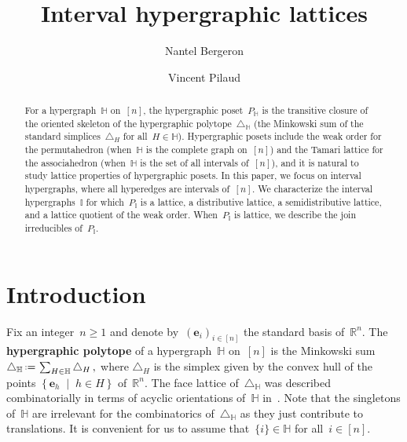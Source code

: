 \documentclass[reqno]{amsart}
\title{Interval hypergraphic lattices}
\author[N.~Bergeron]{Nantel Bergeron}
\author{Vincent Pilaud}
\theoremstyle{definition}
\newcommand{\R}{\mathbb{R}} %
\renewcommand{\b}[1]{\boldsymbol{#1}} %
\newcommand{\set}[2]{\left\{ #1 \;\middle|\; #2 \right\}} %
\newcommand{\eqdef}{\mbox{\,\raisebox{0.2ex}{\scriptsize\ensuremath{\mathrm:}}\ensuremath{=}\,}} %
\newcommand{\simplex}{\triangle} %
\newcommand{\defn}[1]{\textbf{\textsf{\color{PineGreen} #1}}} %
\newcommand{\HH}{\mathbb H}  %
\newcommand{\II}{\mathbb I} %
\begin{document}
\begin{abstract}
For a hypergraph~$\HH$ on~$[n]$, the hypergraphic poset~$P_\HH$ is the transitive closure of the oriented skeleton of the hypergraphic polytope~$\simplex_\HH$ (the Minkowski sum of the standard simplices~$\simplex_H$ for all~$H \in \HH$).
Hypergraphic posets include the weak order for the permutahedron (when~$\HH$ is the complete graph on~$[n]$) and the Tamari lattice for the associahedron (when~$\HH$ is the set of all intervals of~$[n]$), and it is natural to study lattice properties of hypergraphic posets.
In this paper, we focus on interval hypergraphs, where all hyperedges are intervals of~$[n]$.
We characterize the interval hypergraphs~$\II$ for which~$P_\II$ is a lattice, a distributive lattice, a semidistributive lattice, and a lattice quotient of the weak order.
When~$P_\II$ is lattice, we describe the join irreducibles of~$P_\II$.
\end{abstract}

\maketitle

\tableofcontents


\section{Introduction}
\label{sec:introduction}

Fix an integer~$n \ge 1$ and denote by~$(\b{e}_i)_{i \in [n]}$ the standard basis of~$\R^n$.
The \defn{hypergraphic polytope} of a hypergraph~$\HH$ on~$[n]$ is the Minkowski sum
\(
\simplex_\HH \eqdef \sum_{H\in \HH} \simplex_H\,,
\)
where $\simplex_H$ is the simplex given by the convex hull of the points $\set{\b{e}_h}{h \in H}$ of~$\R^n$.
The face lattice of~$\simplex_\HH$ was described combinatorially in terms of acyclic orientations of~$\HH$ in~\cite{BenedettiBergeronMachacek}.
Note that the singletons of~$\HH$ are irrelevant for the combinatorics of~$\triangle_\HH$ as they just contribute to translations.
It is convenient for us to assume that~$\{i\} \in \HH$ for all~$i \in [n]$.
\end{document}
